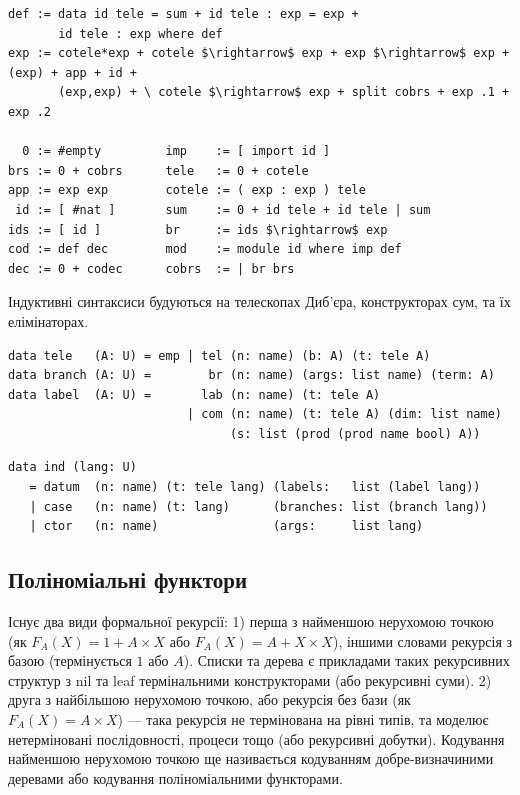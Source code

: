 \begin{lstlisting}[mathescape=true]
def := data id tele = sum + id tele : exp = exp +
       id tele : exp where def
exp := cotele*exp + cotele $\rightarrow$ exp + exp $\rightarrow$ exp + (exp) + app + id +
       (exp,exp) + \ cotele $\rightarrow$ exp + split cobrs + exp .1 + exp .2

  0 := #empty         imp    := [ import id ]
brs := 0 + cobrs      tele   := 0 + cotele
app := exp exp        cotele := ( exp : exp ) tele
 id := [ #nat ]       sum    := 0 + id tele + id tele | sum
ids := [ id ]         br     := ids $\rightarrow$ exp
cod := def dec        mod    := module id where imp def
dec := 0 + codec      cobrs  := | br brs
\end{lstlisting}

Індуктивні синтаксиси будуються на телескопах Диб'єра,
конструкторах сум, та їх елімінаторах.

\begin{lstlisting}
data tele   (A: U) = emp | tel (n: name) (b: A) (t: tele A)
data branch (A: U) =        br (n: name) (args: list name) (term: A)
data label  (A: U) =       lab (n: name) (t: tele A)
                         | com (n: name) (t: tele A) (dim: list name)
                               (s: list (prod (prod name bool) A))
\end{lstlisting}

\begin{lstlisting}
data ind (lang: U)
   = datum  (n: name) (t: tele lang) (labels:   list (label lang))
   | case   (n: name) (t: lang)      (branches: list (branch lang))
   | ctor   (n: name)                (args:     list lang)
\end{lstlisting}

\subsection{Поліноміальні функтори}

Існує два види формальної рекурсії: 1) перша з найменшою нерухомою точкою
(як $F_A(X) = 1 + A \times X$ або $F_A(X) = A + X \times X$), іншими словами
рекурсія з базою (термінується $1$ або $A$). Списки та дерева є
прикладами таких рекурсивних структур з nil та leaf термінальними
конструкторами (або рекурсивні суми).
2) друга з найбільшою нерухомою точкою, або рекурсія без бази
(як $F_A(X) = A \times X$) --- така рекурсія не термінована на рівні типів,
та моделює нетерміновані послідовності, процеси тощо (або рекурсивні добутки).
Кодування найменшою нерухомою точкою ще називається кодуванням
добре-визначиними деревами або кодування поліноміальними функторами.

